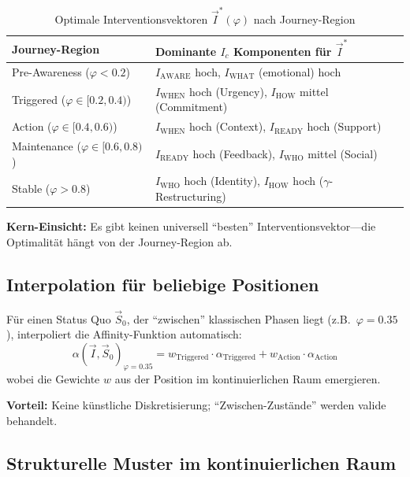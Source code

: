 \begin{table}[htbp]
\centering
\caption{Optimale Interventionsvektoren $\vec{I}^*(\varphi)$ nach Journey-Region}
\label{tab:18-optimal-vectors}
\renewcommand{\arraystretch}{1.4}
\footnotesize
\begin{tabular}{@{}lp{8cm}@{}}
\toprule
\textbf{Journey-Region} & \textbf{Dominante $I_c$ Komponenten für $\vec{I}^*$} \\
\midrule
Pre-Awareness ($\varphi < 0.2$) & $I_{\text{AWARE}}$ hoch, $I_{\text{WHAT}}$ (emotional) hoch \\
Triggered ($\varphi \in [0.2, 0.4)$) & $I_{\text{WHEN}}$ hoch (Urgency), $I_{\text{HOW}}$ mittel (Commitment) \\
Action ($\varphi \in [0.4, 0.6)$) & $I_{\text{WHEN}}$ hoch (Context), $I_{\text{READY}}$ hoch (Support) \\
Maintenance ($\varphi \in [0.6, 0.8)$) & $I_{\text{READY}}$ hoch (Feedback), $I_{\text{WHO}}$ mittel (Social) \\
Stable ($\varphi > 0.8$) & $I_{\text{WHO}}$ hoch (Identity), $I_{\text{HOW}}$ hoch ($\gamma$-Restructuring) \\
\bottomrule
\end{tabular}
\end{table}

\textbf{Kern-Einsicht:} Es gibt keinen universell ``besten'' Interventionsvektor---die Optimalität hängt von der Journey-Region ab.

\subsection{Interpolation für beliebige Positionen}

Für einen Status Quo $\vec{S}_0$, der ``zwischen'' klassischen Phasen liegt (z.B.\ $\varphi = 0.35$), interpoliert die Affinity-Funktion automatisch:
\begin{equation}
\alpha(\vec{I}, \vec{S}_0)_{\varphi=0.35} = w_{\text{Triggered}} \cdot \alpha_{\text{Triggered}} + w_{\text{Action}} \cdot \alpha_{\text{Action}}
\end{equation}
wobei die Gewichte $w$ aus der Position im kontinuierlichen Raum emergieren.

\textbf{Vorteil:} Keine künstliche Diskretisierung; ``Zwischen-Zustände'' werden valide behandelt.

\subsection{Strukturelle Muster im kontinuierlichen Raum}

